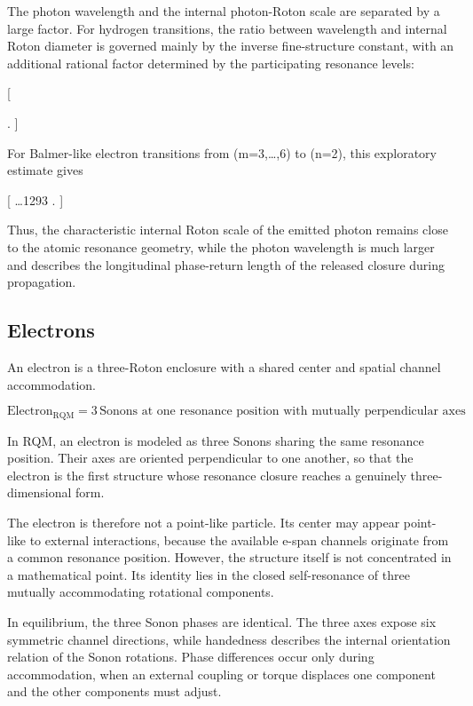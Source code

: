 \documentclass[11pt,a4paper]{article}
\begin{document}
The photon wavelength and the internal photon-Roton scale are separated by a large factor. For hydrogen transitions, the ratio between wavelength and internal Roton diameter is governed mainly by the inverse fine-structure constant, with an additional rational factor determined by the participating resonance levels:

[

\frac{2\pi}{\alpha}
.
]

For Balmer-like electron transitions from (m=3,\dots,6) to (n=2), this exploratory estimate gives

[
 \dots 1293 .
]

Thus, the characteristic internal Roton scale of the emitted photon remains close to the atomic resonance geometry, while the photon wavelength is much larger and describes the longitudinal phase-return length of the released closure during propagation.



\subsection{Electrons}

An electron is a three-Roton enclosure with a shared center and spatial channel accommodation.

\[
\text{Electron}_{\mathrm{RQM}} = 3\,\text{Sonons at one resonance position with mutually perpendicular axes}
\]

In RQM, an electron is modeled as three Sonons sharing the same resonance position. Their axes are oriented perpendicular to one another, so that the electron is the first structure whose resonance closure reaches a genuinely three-dimensional form.

The electron is therefore not a point-like particle. Its center may appear point-like to external interactions, because the available e-span channels originate from a common resonance position. However, the structure itself is not concentrated in a mathematical point. Its identity lies in the closed self-resonance of three mutually accommodating rotational components.

In equilibrium, the three Sonon phases are identical. The three axes expose six symmetric channel directions, while handedness describes the internal orientation relation of the Sonon rotations. Phase differences occur only during accommodation, when an external coupling or torque displaces one component and the other components must adjust.
\end{document}
